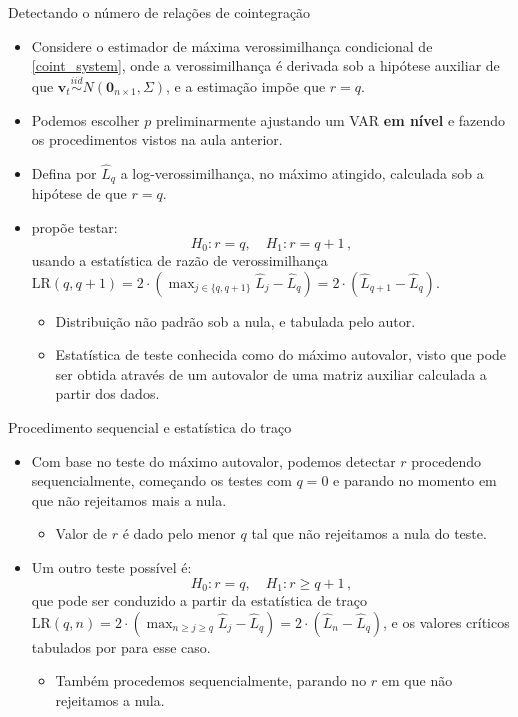\documentclass[11pt]{beamer}
\newenvironment{halfwideitemize}{\itemize\addtolength{\itemsep}{0.5em}}{\enditemize}
\begin{document}
\begin{frame}{Detectando o número de relações de cointegração}
	\begin{itemize}
		\item Considere o estimador de máxima verossimilhança condicional de \eqref{coint_system}, onde a verossimilhança é derivada sob a hipótese auxiliar de que $\boldsymbol{v}_t \overset{iid}{\sim} N(\boldsymbol{0}_{n\times 1}, \Sigma)$, e a estimação impõe que $r=q$.
		\begin{halfwideitemize}
			\item Podemos escolher $p$ preliminarmente ajustando um VAR \textbf{em nível} e fazendo os procedimentos vistos na aula anterior.
		\end{halfwideitemize}
								\item Defina por  $\hat{L}_q$ a log-verossimilhança, no máximo atingido, calculada sob a hipótese de que $r=q$.
		\item \citet{Johansen1991} propõe testar:
		$$H_0 : r= q, \quad H_1: r= q+1\, ,$$
		usando a estatística de razão de verossimilhança $\text{LR}(q,q+1) = 2 \cdot (\max_{j \in \{q,q+1\}} \hat L_{j} - \hat L_q)  = 2 \cdot ( \hat L_{q+1} - \hat L_q)$.
		\begin{itemize}
			\item Distribuição não padrão sob a nula, e tabulada pelo autor.
			\item Estatística de teste conhecida como do {\color{blue}máximo autovalor}, visto que pode ser obtida através de um autovalor de uma matriz auxiliar calculada a partir dos dados.
		\end{itemize}
				
	\end{itemize}
\end{frame}
\begin{frame}{Procedimento sequencial e estatística do traço}
	\begin{itemize}
				\item Com base no teste do máximo autovalor, podemos detectar $r$ procedendo sequencialmente, começando os testes com $q=0$ e parando no momento em que não rejeitamos mais a nula.
				\begin{itemize}
					\item Valor de $r$ é dado pelo menor $q$ tal que não rejeitamos a nula do teste.
				\end{itemize} 
	 		\item Um outro teste possível é:
		$$H_0 : r= q, \quad H_1: r\geq q+1 \, ,$$
		que pode ser conduzido a partir da {\color{blue}estatística de traço} $\text{LR}(q,n) = 2 \cdot ( \max_{n\geq j\geq q} \hat L_{j} - \hat L_q)= 2 \cdot ( \hat L_{n} - \hat L_q)$, e os valores críticos tabulados por \citet{Johansen1991} para esse caso.
		\begin{itemize}
			\item Também procedemos sequencialmente, parando no $r$ em que não rejeitamos a nula. 
		\end{itemize}
	\end{itemize}
\end{frame}
\end{document}
